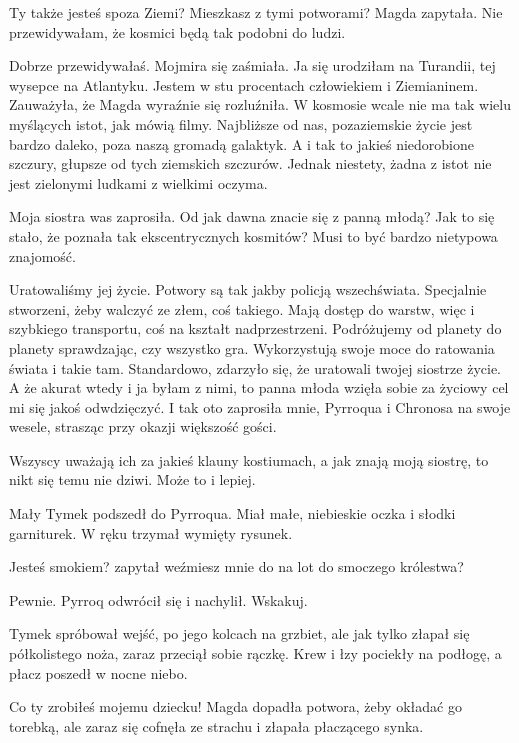 \ds{} Ty także jesteś spoza Ziemi? Mieszkasz z tymi potworami? \dm{} Magda zapytała. \dm{} Nie przewidywałam, że kosmici będą tak podobni do ludzi. \de{}

\ds{} Dobrze przewidywałaś. \dm{} Mojmira się zaśmiała. \dm{} Ja się urodziłam na Turandii, tej wysepce na Atlantyku. Jestem w stu procentach człowiekiem i Ziemianinem.
\dm{} Zauważyła, że Magda wyraźnie się rozluźniła. \dm{} W kosmosie wcale nie ma tak wielu myślących istot, jak mówią filmy. 
Najbliższe od nas, pozaziemskie życie jest bardzo daleko, poza naszą gromadą galaktyk. A i tak to jakieś niedorobione szczury, głupsze od tych ziemskich szczurów.
Jednak niestety, żadna z istot nie jest zielonymi ludkami z wielkimi oczyma.\de{}

\ds{} Moja siostra was zaprosiła. Od jak dawna znacie się z panną młodą? Jak to się stało, że poznała tak ekscentrycznych kosmitów? Musi to być bardzo nietypowa znajomość. \de{} 

\ds{} Uratowaliśmy jej życie. Potwory są tak jakby policją wszechświata. Specjalnie stworzeni, żeby walczyć ze złem, coś takiego.
Mają dostęp do warstw, więc i szybkiego transportu, coś na kształt nadprzestrzeni. Podróżujemy od planety do planety sprawdzając, czy wszystko gra.
Wykorzystują swoje moce do ratowania świata i takie tam. Standardowo, zdarzyło się, że uratowali twojej siostrze życie.
A że akurat wtedy i ja byłam z nimi, to panna młoda wzięła sobie za życiowy cel mi się jakoś odwdzięczyć. 
I tak oto zaprosiła mnie, Pyrroqua i Chronosa na swoje wesele, strasząc przy okazji większość gości.\de{}

\ds{} Wszyscy uważają ich za jakieś klauny kostiumach, a jak znają moją siostrę, to nikt się temu nie dziwi. Może to i lepiej. \de{}

Mały Tymek podszedł do Pyrroqua. Miał małe, niebieskie oczka i słodki garniturek.
W ręku trzymał wymięty rysunek.

\ds{} Jesteś smokiem? \dm{} zapytał \dm{} weźmiesz mnie do na lot do smoczego królestwa?\de{}

\ds{} Pewnie. \dm{} Pyrroq odwrócił się i nachylił. \dm{} Wskakuj. \de{}

Tymek spróbował wejść, po jego kolcach na grzbiet, ale jak tylko złapał się półkolistego noża, zaraz przeciął sobie rączkę. 
Krew i łzy pociekły na podłogę, a płacz poszedł w nocne niebo. 

\ds{} Co ty zrobiłeś mojemu dziecku! \dm{} Magda dopadła potwora, żeby okładać go torebką, ale zaraz się cofnęła ze strachu i złapała płaczącego synka. \de{}

